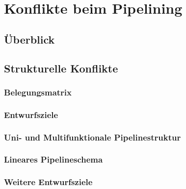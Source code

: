 \section{Konflikte beim Pipelining}
\subsection{Überblick}

\subsection{Strukturelle Konflikte}
\subsubsection{Belegungsmatrix}
\subsubsection{Entwurfsziele}
\subsubsection{Uni- und Multifunktionale Pipelinestruktur}
\subsubsection{Lineares Pipelineschema}
\subsubsection{Weitere Entwurfsziele}
